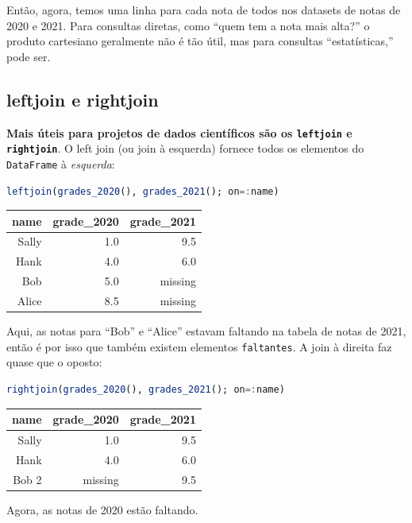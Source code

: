 \documentclass[
  notoc %
]{tufte-book}
\newcommand{\passthrough}[1]{#1}
\begin{document}
Então, agora, temos uma linha para cada nota de todos nos datasets de
notas de 2020 e 2021. Para consultas diretas, como ``quem tem a nota
mais alta?'' o produto cartesiano geralmente não é tão útil, mas para
consultas ``estatísticas,'' pode ser.

\hypertarget{sec:leftjoin_rightjoin}{%
\subsection{leftjoin e rightjoin}\label{sec:leftjoin_rightjoin}}

\textbf{Mais úteis para projetos de dados científicos são os
\passthrough{\lstinline!leftjoin!} e
\passthrough{\lstinline!rightjoin!}}. O left join (ou join à esquerda)
fornece todos os elementos do \passthrough{\lstinline!DataFrame!} à
\emph{esquerda}:

\begin{lstlisting}[language=Julia]
leftjoin(grades_2020(), grades_2021(); on=:name)
\end{lstlisting}

\begin{longtable}[]{@{}rrr@{}}
\toprule
name & grade\_2020 & grade\_2021 \\
\midrule
\endhead
Sally & 1.0 & 9.5 \\
Hank & 4.0 & 6.0 \\
Bob & 5.0 & missing \\
Alice & 8.5 & missing \\
\bottomrule
\end{longtable}

Aqui, as notas para ``Bob'' e ``Alice'' estavam faltando na tabela de
notas de 2021, então é por isso que também existem elementos
\passthrough{\lstinline!faltantes!}. A join à direita faz quase que o
oposto:

\begin{lstlisting}[language=Julia]
rightjoin(grades_2020(), grades_2021(); on=:name)
\end{lstlisting}

\begin{longtable}[]{@{}rrr@{}}
\toprule
name & grade\_2020 & grade\_2021 \\
\midrule
\endhead
Sally & 1.0 & 9.5 \\
Hank & 4.0 & 6.0 \\
Bob 2 & missing & 9.5 \\
\bottomrule
\end{longtable}

Agora, as notas de 2020 estão faltando.
\end{document}
